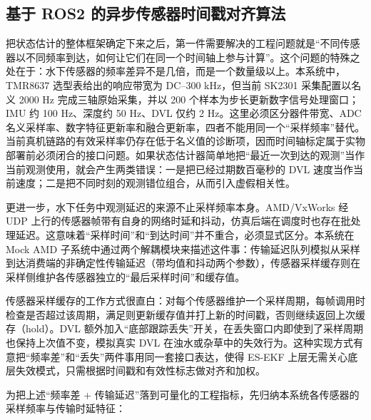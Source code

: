 \subsection{基于 ROS2 的异步传感器时间戳对齐算法}\label{sec:ch03-3-2-1}

把状态估计的整体框架确定下来之后，第一件需要解决的工程问题就是``不同传感器以不同频率到达，如何让它们在同一个时间轴上参与计算''。这个问题的特殊之处在于：水下传感器的频率差异不是几倍，而是一个数量级以上。本系统中，TMR8637 选型表给出的响应带宽为 DC--300 kHz，但当前 SK2301 采集配置以名义 2000 Hz 完成三轴原始采集，并以 200 个样本为步长更新数字信号处理窗口；IMU 约 100 Hz、深度约 50 Hz、DVL 仅约 2 Hz。这里必须区分器件带宽、ADC 名义采样率、数字特征更新率和融合更新率，四者不能用同一个``采样频率''替代。当前真机链路的有效采样率仍存在低于名义值的诊断项，因而时间轴标定属于实物部署前必须闭合的接口问题。如果状态估计器简单地把``最近一次到达的观测''当作当前观测使用，就会产生两类错误：一是把已经过期数百毫秒的 DVL 速度当作当前速度；二是把不同时刻的观测错位组合，从而引入虚假相关性。

更进一步，水下任务中观测延迟的来源不止采样频率本身。AMD/VxWorks 经 UDP 上行的传感器帧带有自身的网络时延和抖动，仿真后端在调度时也存在批处理延迟。这意味着``采样时间''和``到达时间''并不重合，必须显式区分。本系统在 Mock AMD 子系统中通过两个解耦模块来描述这件事：传输延迟队列模拟从采样到达消费端的非确定性传输延迟（带均值和抖动两个参数），传感器采样缓存则在采样侧维护各传感器独立的``最后采样时间''和缓存值。

传感器采样缓存的工作方式很直白：对每个传感器维护一个采样周期，每帧调用时检查是否超过该周期，满足则更新缓存值并打上新的时间戳，否则继续返回上次缓存（hold）。DVL 额外加入``底部跟踪丢失''开关，在丢失窗口内即使到了采样周期也保持上次值不变，模拟真实 DVL 在浊水或杂草中的失效行为。这种实现方式有意把``频率差''和``丢失''两件事用同一套接口表达，使得 ES-EKF 上层无需关心底层失效模式，只需根据时间戳和有效性标志做对齐和加权。

为把上述``频率差 + 传输延迟''落到可量化的工程指标，先归纳本系统各传感器的采样频率与传输时延特征：

